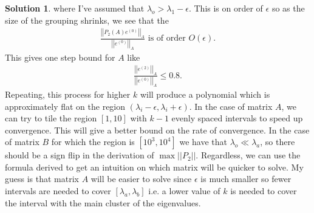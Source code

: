\documentclass[12pt]{article}
\newcommand{\norm}[1]{ \left|\left| #1 \right|\right| }
\theoremstyle{definition}
\newtheorem{sol}{Solution}
\theoremstyle{remark}
\begin{document}
\begin{sol}
where I've assumed  that $\lambda_{o} > \lambda_{1} - \epsilon$. This is on order of $\epsilon$ so as the size of the grouping shrinks, we see that the
\begin{align*}
    \frac{\norm{P_2(A) e^{(0)}}_{A}}{\norm{ e^{(0)} }_{A}}  \text{ is of order } O(\epsilon).
\end{align*}
This gives one step bound for $A$ like
\begin{align*}
    \frac{\norm{e^{(2)}}_{A}}{\norm{ e^{(0)} }_{A}} \leq 0.8.
\end{align*}
Repeating, this process for higher $k$ will produce a polynomial which is approximately flat on the region $(\lambda_{i} - \epsilon, \lambda_{i} + \epsilon)$. In the case of matrix $A$, we can try to tile the region $[1, 10]$ with $k-1$ evenly spaced intervals to speed up convergence. This will give a better bound on the rate of convergence. In the case of matrix $B$ for which the region is $[10^{3}, 10^{4}]$ we have that $\lambda_{o} \ll \lambda_{a}$, so there should be a sign flip in the derivation of $\max \norm{P_{2}}$. Regardless, we can use the formula derived to get an intuition on which matrix will be quicker to solve. My guess is that matrix $A$ will be easier to solve since $\epsilon$ is much smaller so fewer intervals are needed to cover $[\lambda_{a}, \lambda_{b}]$ i.e. a lower value of $k$ is needed to cover the interval with the main cluster of the eigenvalues. 
\end{sol} 
\end{document}

